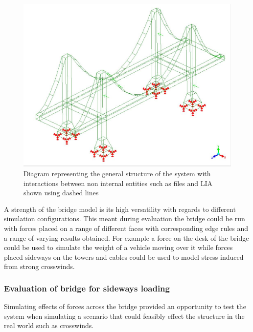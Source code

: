\begin{figure}
  \centerline{\includegraphics[width=150mm, scale=1]{../Graphics/BasicBridge.jpeg}}
  \caption{Diagram representing the general structure of the system with interactions between non internal entities such as files and LIA shown using dashed lines}
  \label{fig:h-refinementImp}
\end{figure}


\newpage


\noindent
A strength of the bridge model is its high versatility with regards to different simulation configurations. This meant during evaluation the bridge could be run with forces placed on a range of different faces with corresponding edge rules and a range of varying results obtained. For example a force on the desk of the bridge could be used to simulate the weight of a vehicle moving over it while forces placed sideways on the towers and cables could be used to model stress induced from strong crosswinds.

\subsubsection{Evaluation of bridge for sideways loading}
Simulating effects of forces across the bridge provided an opportunity  to test the system when simulating a scenario that could feasibly effect the structure in the real world such as crosswinds.


